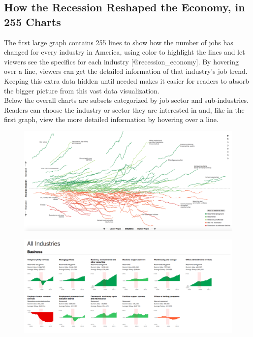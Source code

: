\documentclass[]{book}
\theoremstyle{definition}
\theoremstyle{definition}
\theoremstyle{definition}
\theoremstyle{remark}
\begin{document}
\subsection{How the Recession Reshaped the Economy, in 255
Charts}\label{how-the-recession-reshaped-the-economy-in-255-charts}

The first large graph contains 255 lines to show how the number of jobs
has changed for every industry in America, using color to highlight the
lines and let viewers see the specifics for each industry
{[}@recession\_economy{]}. By hovering over a line, viewers can get the
detailed information of that industry's job trend. Keeping this extra
data hidden until needed makes it easier for readers to absorb the
bigger picture from this vast data visualization.\\
Below the overall charts are subsets categorized by job sector and
sub-industries. Readers can choose the industry or sector they are
interested in and, like in the first graph, view the more detailed
information by hovering over a line.

\begin{figure}
\centering
\includegraphics{images/recession_jobs.png}
\caption{}
\end{figure}

\begin{figure}
\centering
\includegraphics{images/recession_jobs2.png}
\caption{}
\end{figure}
\end{document}
